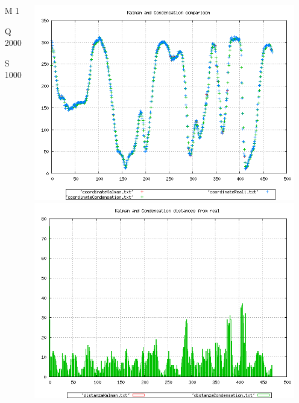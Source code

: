 {\begin{columns}
\begin{scriptsize}
\begin{itemize}
\item [M]1
\item [Q]2000
\item [S]1000
\end{itemize}
\end{scriptsize}
\includegraphics[scale=0.1]{../esperimenti/tappeto_nozoom/mod_1-Q_2000-S_1000/plot.png}\\
\includegraphics[scale=0.1]{../esperimenti/tappeto_nozoom/mod_1-Q_2000-S_1000/plot-distances.png}
\end{columns}

}
